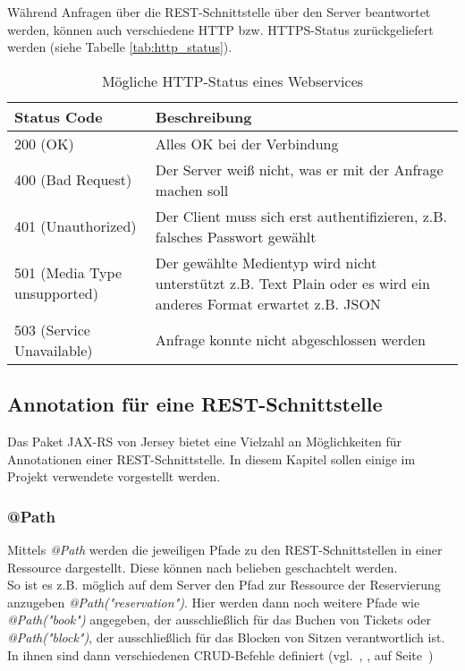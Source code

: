 Während Anfragen über die \acs{REST}-Schnittstelle über den Server beantwortet werden, können auch verschiedene \acs{HTTP} bzw. \acs{HTTPS}-Status zurückgeliefert werden (siehe Tabelle \vref{tab:http_status}).

\begin{table}[!hpt]
	\renewcommand{\arraystretch}{1.2}
	\centering
	\begin{tabular}{l|p{8.5cm}}
		Status Code & Beschreibung \\
		\hline
		200 (OK) & Alles OK bei der Verbindung \\
		400 (Bad Request) & Der Server weiß nicht, was er mit der Anfrage machen soll \\
		401 (Unauthorized) & Der Client muss sich erst authentifizieren, z.B. falsches Passwort gewählt \\
		501 (Media Type unsupported) & Der gewählte Medientyp wird nicht unterstützt z.B. Text Plain oder es wird ein anderes Format erwartet z.B. \acs{JSON} \\
		503 (Service Unavailable) & Anfrage konnte nicht abgeschlossen werden
	\end{tabular}
	\caption{Mögliche \acs{HTTP}-Status eines Webservices}
\label{tab:http_status}
\end{table}
\clearpage

\subsection{Annotation für eine \acs{REST}-Schnittstelle}
\label{ssec:annotationen_schnittstelle}
\authorsection{\authorSG}
Das Paket JAX-RS von Jersey bietet eine Vielzahl an Möglichkeiten für Annotationen einer \acs{REST}-Schnittstelle. In diesem Kapitel sollen einige im Projekt verwendete vorgestellt werden.

\subsubsection*{@Path}
Mittels \textit{@Path} werden die jeweiligen Pfade zu den \acs{REST}-Schnittstellen in einer Ressource dargestellt. Diese können nach belieben geschachtelt werden. \\
So ist es z.B. möglich auf dem Server den Pfad zur Ressource der Reservierung anzugeben \textit{@Path("reservation")}. 
Hier werden dann noch weitere Pfade wie \textit{@Path("book")} angegeben, der ausschließlich für das Buchen von Tickets oder \textit{@Path("block")}, der ausschließlich für das Blocken von Sitzen verantwortlich ist. In ihnen sind dann verschiedenen \acs{CRUD}-Befehle definiert (vgl.~, ,  auf Seite~\pageref{sss:delete}) 

